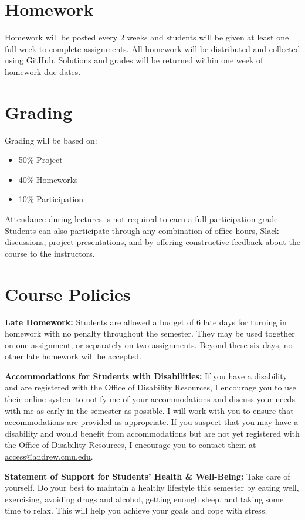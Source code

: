 \documentclass[11pt,letterpaper]{article}
\begin{document}
\section*{Homework}

Homework will be posted every 2 weeks and students will be given at least one full week to complete assignments. All homework will be distributed and collected using GitHub. Solutions and grades will be returned within one week of homework due dates.

\section*{Grading}

Grading will be based on:
\begin{itemize}
	\item 50\% Project
	\item 40\% Homeworks
	\item 10\% Participation
\end{itemize}
Attendance during lectures is not required to earn a full participation grade. Students can also participate through any combination of office hours, Slack discussions, project presentations, and by offering constructive feedback about the course to the instructors.


\section*{Course Policies}

\textbf{Late Homework:} Students are allowed a budget of 6 late days for turning in homework with no penalty throughout the semester. They may be used together on one assignment, or separately on two assignments. Beyond these six days, no other late homework will be accepted.

\medskip
\noindent
\textbf{Accommodations for Students with Disabilities:} If you have a disability and are registered with the Office of Disability Resources, I encourage you to use their online system to notify me of your accommodations and discuss your needs with me as early in the semester as possible. I will work with you to ensure that accommodations are provided as appropriate. If you suspect that you may have a disability and would benefit from accommodations but are not yet registered with the Office of Disability Resources, I encourage you to contact them at \href{mailto:access@andrew.cmu.edu}{access@andrew.cmu.edu}.

\medskip
\noindent
\textbf{Statement of Support for Students' Health \& Well-Being:} Take care of yourself. Do your best to maintain a healthy lifestyle this semester by eating well, exercising, avoiding drugs and alcohol, getting enough sleep, and taking some time to relax. This will help you achieve your goals and cope with stress.
\end{document}
